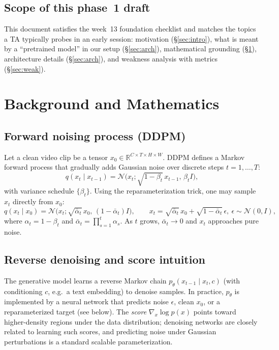 \documentclass[11pt,a4paper]{article}
\begin{document}
\subsection{Scope of this phase~1 draft}
This document satisfies the week~13 foundation checklist and matches the topics a TA typically probes in an early session: motivation (\S\ref{sec:intro}), what is meant by a ``pretrained model'' in our setup (\S\ref{sec:arch}), mathematical grounding (\S\ref{sec:math}), architecture details (\S\ref{sec:arch}), and weakness analysis with metrics (\S\ref{sec:weak}).

\section{Background and Mathematics}
\label{sec:math}

\subsection{Forward noising process (DDPM)}
Let a clean video clip be a tensor $x_0 \in \mathbb{R}^{C \times T \times H \times W}$.
DDPM defines a Markov forward process that gradually adds Gaussian noise over discrete steps $t = 1,\ldots,T$:
\begin{equation}
  q(x_t \mid x_{t-1}) = \mathcal{N}\bigl(x_t; \sqrt{1-\beta_t}\, x_{t-1},\, \beta_t I\bigr),
\end{equation}
with variance schedule $\{\beta_t\}$.
Using the reparameterization trick, one may sample $x_t$ directly from $x_0$:
\begin{equation}
  q(x_t \mid x_0) = \mathcal{N}\bigl(x_t; \sqrt{\bar{\alpha}_t}\, x_0,\, (1-\bar{\alpha}_t) I\bigr),
  \qquad
  x_t = \sqrt{\bar{\alpha}_t}\, x_0 + \sqrt{1-\bar{\alpha}_t}\,\epsilon,\ \epsilon \sim \mathcal{N}(0,I),
\end{equation}
where $\alpha_t = 1-\beta_t$ and $\bar{\alpha}_t = \prod_{s=1}^t \alpha_s$.
As $t$ grows, $\bar{\alpha}_t \to 0$ and $x_t$ approaches pure noise.

\subsection{Reverse denoising and score intuition}
The generative model learns a reverse Markov chain $p_\theta(x_{t-1}\mid x_t, c)$ (with conditioning $c$, e.g.\ a text embedding) to denoise samples.
In practice, $p_\theta$ is implemented by a neural network that predicts noise $\epsilon$, clean $x_0$, or a reparameterized target (see below).
The \emph{score} $\nabla_x \log p(x)$ points toward higher-density regions under the data distribution; denoising networks are closely related to learning such scores, and predicting noise under Gaussian perturbations is a standard scalable parameterization.
\end{document}
